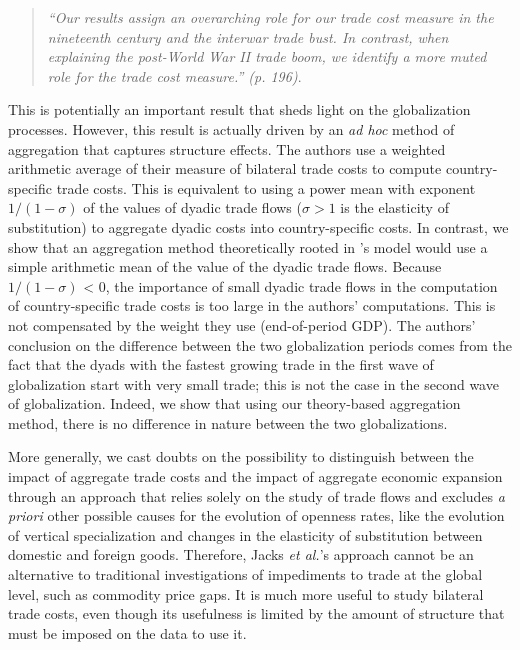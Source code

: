 \documentclass{article}
\begin{document}
\begin{quote}
\emph{``Our results assign an overarching role for our trade
cost measure in the nineteenth century and the interwar trade
bust. In contrast, when explaining the post-World War II trade
boom, we identify a more muted role for the trade cost
measure.'' (p. 196)}.
\end{quote}

This is potentially an important result that sheds light on the globalization processes.
However, this result is actually driven by an \textit{ad hoc} method of aggregation that captures structure effects.
The authors use a weighted arithmetic average of their measure of bilateral trade costs to compute country-specific trade costs. This is equivalent to using a power mean with exponent $1/(1-\sigma)$ of the values of dyadic trade flows ($\sigma > 1$ is the elasticity of substitution) to aggregate dyadic costs into country-specific costs.
In contrast, we show that an aggregation method theoretically rooted in \cite{AW2003}'s model would use a simple arithmetic mean of the value of the dyadic trade flows. 
Because $1/(1-\sigma)$ < 0, the importance of small dyadic trade flows in the computation of country-specific trade costs is too large in the authors' computations.
This is not compensated by the weight they use (end-of-period GDP). The authors' conclusion on the difference between the two globalization periods comes from the fact that the dyads with the fastest growing trade in the first wave of globalization start with very small trade; this is not the case in the second wave of globalization.
Indeed, we show that using our theory-based aggregation method, there is no difference in nature between the two globalizations.

More generally, we cast doubts on the possibility to distinguish between the impact of aggregate trade costs and the impact of aggregate economic expansion through an approach that relies solely on the study of trade flows and excludes \textit{a priori} other possible causes for the evolution of openness rates, like the evolution of vertical specialization and changes in the elasticity of substitution between domestic and foreign goods.
Therefore, Jacks \textit{et al.}'s approach cannot be an alternative to traditional investigations of impediments to trade at the global level, such as commodity price gaps.
It is much more useful to study bilateral trade costs, even though its usefulness is limited by the amount of structure that must be imposed on the data to use it. 
\end{document}
